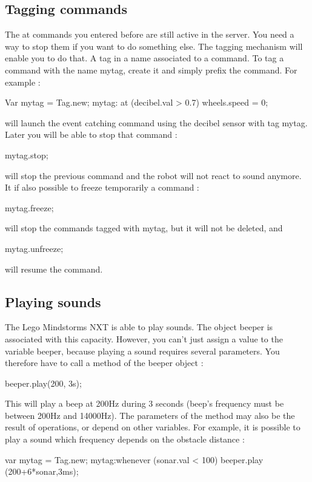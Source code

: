 \subsection{Tagging commands}
The at commands you entered before are still active in the server. You need a
way to stop them if you want to do something else. The tagging mechanism will
enable you to do that.
A tag in a name associated to a command. To tag a command with the name mytag,
create it and simply prefix the command. For example :
\begin{urbiunchecked}
  Var mytag = Tag.new; mytag: at (decibel.val > 0.7) wheels.speed = 0;
\end{urbiunchecked}

will launch the event catching command using the decibel sensor with tag mytag.
Later you will be able to stop that command :
\begin{urbiunchecked}
  mytag.stop;
\end{urbiunchecked}

will stop the previous command and the robot will not react to sound anymore.
It if also possible to freeze temporarily a command :
\begin{urbiunchecked}
  mytag.freeze;
\end{urbiunchecked}

will stop the commands tagged with mytag, but it will not be deleted, and
\begin{urbiunchecked}
  mytag.unfreeze;
\end{urbiunchecked}

will resume the command.

\subsection{Playing sounds}
\label{sec:nxt:sounds}
The Lego Mindstorms NXT is able to play sounds. The object beeper is associated
with this capacity. However, you can't just assign a value to the variable
beeper, because playing a sound requires several parameters. You therefore have
to call a method of the beeper object :
\begin{urbiunchecked}
  beeper.play(200, 3s);
\end{urbiunchecked}

This will play a beep at 200Hz during 3 seconds (beep's frequency must be
between 200Hz and 14000Hz).
The parameters of the method may also be the result of operations, or depend on
other variables. For example, it is possible to play a sound which frequency
depends on the obstacle distance :
\begin{urbiunchecked}
  var mytag = Tag.new; mytag:whenever (sonar.val < 100) beeper.play
(200+6*sonar,3ms);
\end{urbiunchecked}

